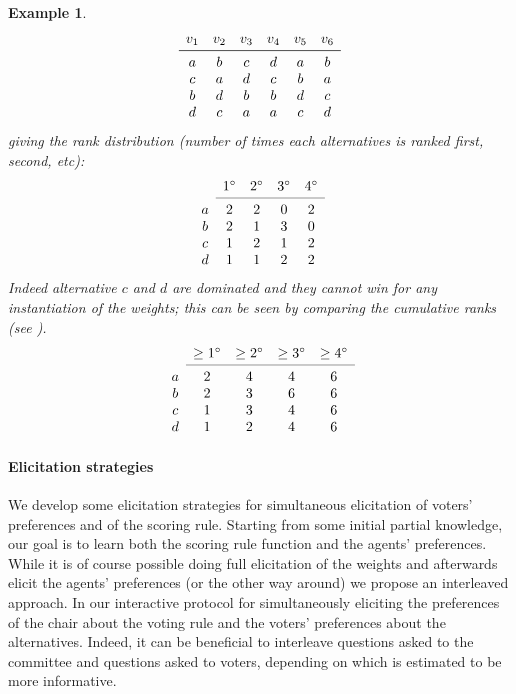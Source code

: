 \documentclass[12pt]{article}
\newtheorem{example}{Example}
\begin{document}
\begin{example}
\[
\begin{array}{cccccc}
v_1& v_2& v_3 & v_4& v_5& v_6 \\
\midrule 
a& b& c & d& a& b \\
c& a& d& c& b& a \\
b& d& b& b& d& c \\
d& c& a& a& c& d \\
\end{array}
\]
giving the rank distribution (number of times each alternatives is ranked first, second, etc): 
\[
\begin{array}{ccccc}
& 1^\circ& 2^\circ& 3^\circ& 4^\circ \\
\cmidrule{2-5}
a & 2& 2& 0& 2 \\
b& 2& 1& 3& 0 \\
c& 1& 2& 1& 2 \\
d& 1& 1& 2& 2 \\
\end{array}
\]
Indeed alternative $c$ and $d$ are dominated and they cannot win for any instantiation of the weights; this can be seen by comparing the cumulative ranks (see  \cite{Stein1994}).
\[
\begin{array}{ccccc}
& \geq 1^\circ
& \geq 2^\circ
& \geq 3^\circ
& \geq 4^\circ \\
\cmidrule{2-5}
a & 2 & 4& 4& 6 \\
b & 2 & 3& 6& 6 \\
c& 1& 3& 4& 6 \\
d& 1& 2& 4& 6 \\
\end{array}
\]
\end{example}



\paragraph{Elicitation strategies}

We develop some elicitation strategies for simultaneous elicitation of voters' preferences and of the scoring rule.
Starting from some initial partial knowledge, our goal is to learn both the scoring rule function and the agents' preferences.
While it is of course possible doing full elicitation of the weights and afterwards elicit the agents' preferences (or the other way around) we propose an interleaved approach.
In our interactive  protocol for simultaneously eliciting the preferences of the chair about the voting rule and the voters' preferences about the alternatives.
Indeed, it can be beneficial to interleave questions asked to the committee and questions asked to voters, depending on which is estimated to be more informative.
\end{document}

